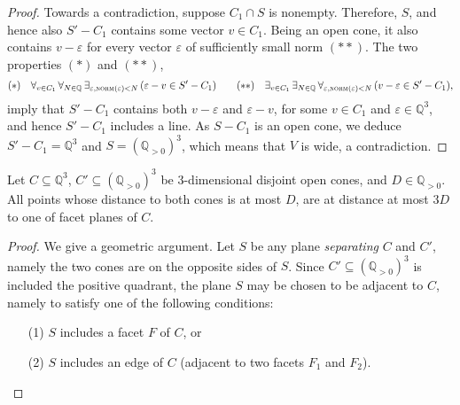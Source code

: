 \documentclass[a4paper, UKenglish, cleveref, autoref, thm-restate]{lipics-v2021}
\newcommand{\Q}{\mathbb{Q}}
\newcommand{\Qpos}{\Q_{>0}}
\newcommand{\prettyexists}[2]{\exists_{#1} \, #2}
\newcommand{\prettyforall}[2]{\forall_{#1} \, #2}
\newcommand{\norm}{\textsc{norm}}
\begin{document}
\begin{appendixproof}
\begin{proof}
Towards a contradiction, suppose $C_1 \cap S$ is nonempty.
Therefore, $S$, and hence also $S'-C_1$ contains some vector $v\in C_1$.
Being an open cone, it also contains $v - \varepsilon$ for every vector $\varepsilon$ of sufficiently small norm
$(**)$.
The two properties $(*)$ and $(**)$,
\[
(*) \ \ \ \prettyforall {v\in C_1} \prettyforall {N\in\Q} \prettyexists {\varepsilon, \norm(\varepsilon)<N} 
(\varepsilon - v \in S'-C_1)
\qquad
(**) \ \ \ \prettyexists {v\in C_1} \prettyexists{N\in\Q} \prettyforall {\varepsilon, \norm(\varepsilon)<N} (v- \varepsilon  \in S'-C_1),
\]
imply that $S'-C_1$ contains both $v-\varepsilon$ and $\varepsilon-v$, for some
$v\in C_1$ and $\varepsilon\in\Q^3$,
and hence $S'-C_1$
includes a line.
As $S-C_1$ is an open cone, we deduce $S'-C_1=\Q^3$ and  $S=(\Qpos)^3$, which means that 
$V$ is wide, a contradiction.
\end{proof}
\begin{claim} \label{claim:onefacet}
Let $C\subseteq \Q^3$, $C'\subseteq (\Qpos)^3$ be 3-dimensional disjoint open cones, and $D\in\Qpos$. 
All points whose distance to both cones is at most $D$,
are at distance at most $3D$ to one of facet planes of $C$.
\end{claim}
\begin{proof}We give a geometric argument.
Let $S$ be any plane \emph{separating} $C$ and $C'$, namely the two cones are on the opposite sides of $S$.
Since $C'\subseteq(\Qpos)^3$ is included the positive quadrant,
the plane $S$ may be chosen to be adjacent to $C$, namely to satisfy one of the following conditions:

\begin{itemize}
\item[(1)] $S$ includes a facet $F$ of $C$, or
\item[(2)] $S$ includes an edge of $C$ (adjacent to two facets $F_1$ and $F_2$).
\end{itemize}


\end{proof}
\end{appendixproof}
\end{document}
